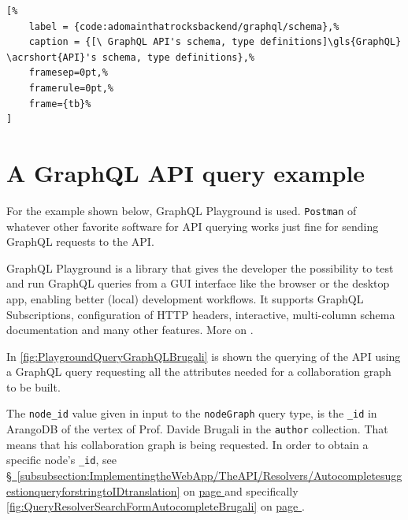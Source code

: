 %
\vspace*{-5.7pt}%
\begin{lstlisting}[%
    label = {code:adomainthatrocksbackend/graphql/schema},%
    caption = {[\ GraphQL API's schema, type definitions]\gls{GraphQL} \acrshort{API}'s schema, type definitions},%
    framesep=0pt,%
    framerule=0pt,%
    frame={tb}%
]
\end{lstlisting}

\section[A GraphQL API query example]{A GraphQL \acrshort{API} query example} \label{section:APIDocs/AGraphQLAPIqueryexample}
For the example shown below, GraphQL Playground is used.
\texttt{\gls{Postman}} of whatever other favorite software for \acrshort{API} querying works just fine for sending \gls{GraphQL request}s to the \acrshort{API}. 

GraphQL Playground is a library that gives the developer the possibility to test and run GraphQL queries from a GUI interface like the browser or the desktop app, enabling better (local) development workflows.
It supports GraphQL Subscriptions, configuration of HTTP headers, interactive, multi-column schema documentation and many other features.
More on .
\medskip

In \hyperref[fig:PlaygroundQueryGraphQLBrugali]{\autoref{fig:PlaygroundQueryGraphQLBrugali}} is shown the querying of the \acrshort{API} using a \gls{GraphQL query} requesting all the attributes needed for a collaboration graph to be built.

The \texttt{node\_id} value given in input to the \texttt{nodeGraph} query type, is the \texttt{\_id} in ArangoDB of the vertex of Prof. Davide Brugali in the \texttt{author} collection.
That means that his collaboration graph is being requested.
In order to obtain a specific node's \texttt{\_id}, see \hyperref[subsubsection:ImplementingtheWebApp/TheAPI/Resolvers/AutocompletesuggestionqueryforstringtoIDtranslation]{\S\ \ref*{subsubsection:ImplementingtheWebApp/TheAPI/Resolvers/AutocompletesuggestionqueryforstringtoIDtranslation}} on \hyperref[subsubsection:ImplementingtheWebApp/TheAPI/Resolvers/AutocompletesuggestionqueryforstringtoIDtranslation]{page \pageref*{subsubsection:ImplementingtheWebApp/TheAPI/Resolvers/AutocompletesuggestionqueryforstringtoIDtranslation}} and specifically \hyperref[fig:QueryResolverSearchFormAutocompleteBrugali]{\autoref{fig:QueryResolverSearchFormAutocompleteBrugali}} on \hyperref[fig:QueryResolverSearchFormAutocompleteBrugali]{page \pageref*{fig:QueryResolverSearchFormAutocompleteBrugali}}.

